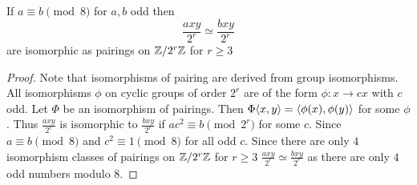 \documentclass{amsart}
\begin{document}
\begin{lem}
 \label{lemma:2-group iso}
 If $a\equiv b\pmod 8$ for $a,b$ odd then
 \begin{equation}
  \frac{axy}{2^{r}}\simeq  \frac{bxy}{2^{r}}
 \end{equation}
  are isomorphic as pairings on $\mathbb{Z}/2^r\mathbb{Z}$ for $r\ge3$
\end{lem}
\begin{proof}
 Note that isomorphisms of pairing are derived from group isomorphisms. All isomorphisms $\phi$ on cyclic groups of order $2^{r}$ are of the form $\phi:x\to cx$ with $c$ odd. Let $\Phi$ be an isomorphism of pairings. Then $\Phi\langle x, y \rangle=\langle \phi(x), \phi(y) \rangle$ for some $\phi$. Thus $\frac{axy}{2^{r}}$ is isomorphic to $\frac{bxy}{2^{r}}$ if  $ac^{2}\equiv b\pmod 2^{r}$ for some $c$. Since $a\equiv b\pmod 8$ and $c^{2}\equiv 1\pmod 8$ for all odd $c$. Since there are only $4$ isomorphism classes of pairings on $\mathbb{Z}/2^r\mathbb{Z}$ for $r\ge3$ %
 $\frac{axy}{2^{r}}\simeq  \frac{bxy}{2^{r}}$ as there are only $4$ odd numbers modulo $8$.
\end{proof}

\begin{prop}

\end{prop}

\begin{thm}

\end{thm}


\begin{center}
\end{center}
\end{document}
